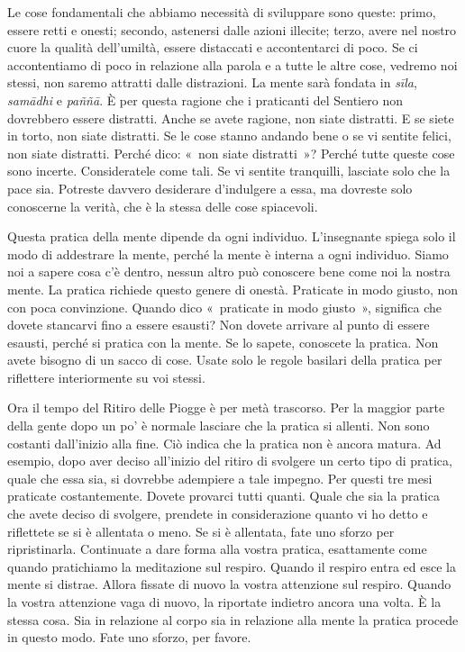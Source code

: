 Le cose fondamentali che abbiamo necessità di sviluppare sono queste:
primo, essere retti e onesti; secondo, astenersi dalle azioni illecite;
terzo, avere nel nostro cuore la qualità dell'umiltà, essere distaccati
e accontentarci di poco. Se ci accontentiamo di poco in relazione alla
parola e a tutte le altre cose, vedremo noi stessi, non saremo attratti
dalle distrazioni. La mente sarà fondata in \emph{sīla}, \emph{samādhi}
e \emph{paññā}. È per questa ragione che i praticanti del Sentiero non
dovrebbero essere distratti. Anche se avete ragione, non siate
distratti. E se siete in torto, non siate distratti. Se le cose stanno
andando bene o se vi sentite felici, non siate distratti. Perché dico:
«~non siate distratti~»? Perché tutte queste cose sono incerte.
Consideratele come tali. Se vi sentite tranquilli, lasciate solo che la
pace sia. Potreste davvero desiderare d'indulgere a essa, ma dovreste
solo conoscerne la verità, che è la stessa delle cose spiacevoli.

Questa pratica della mente dipende da ogni individuo. L'insegnante
spiega solo il modo di addestrare la mente, perché la mente è interna a
ogni individuo. Siamo noi a sapere cosa c'è dentro, nessun altro può
conoscere bene come noi la nostra mente. La pratica richiede questo
genere di onestà. Praticate in modo giusto, non con poca convinzione.
Quando dico «~praticate in modo giusto~», significa che dovete stancarvi
fino a essere esausti? Non dovete arrivare al punto di essere esausti,
perché si pratica con la mente. Se lo sapete, conoscete la pratica. Non
avete bisogno di un sacco di cose. Usate solo le regole basilari della
pratica per riflettere interiormente su voi stessi.

Ora il tempo del Ritiro delle Piogge è per metà trascorso. Per la
maggior parte della gente dopo un po' è normale lasciare che la pratica
si allenti. Non sono costanti dall'inizio alla fine. Ciò indica che la
pratica non è ancora matura. Ad esempio, dopo aver deciso all'inizio del
ritiro di svolgere un certo tipo di pratica, quale che essa sia, si
dovrebbe adempiere a tale impegno. Per questi tre mesi praticate
costantemente. Dovete provarci tutti quanti. Quale che sia la pratica
che avete deciso di svolgere, prendete in considerazione quanto vi ho
detto e riflettete se si è allentata o meno. Se si è allentata, fate uno
sforzo per ripristinarla. Continuate a dare forma alla vostra pratica,
esattamente come quando pratichiamo la meditazione sul respiro. Quando
il respiro entra ed esce la mente si distrae. Allora fissate di nuovo la
vostra attenzione sul respiro. Quando la vostra attenzione vaga di
nuovo, la riportate indietro ancora una volta. È la stessa cosa. Sia in
relazione al corpo sia in relazione alla mente la pratica procede in
questo modo. Fate uno sforzo, per favore.

